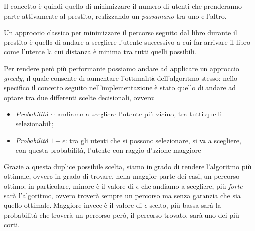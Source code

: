 Il concetto è quindi quello di minimizzare il numero di utenti che prenderanno parte attivamente al prestito, realizzando un \textit{passamano} tra uno e l'altro.

Un approccio classico per minimizzare il percorso seguito dal libro durante il prestito è quello di andare a scegliere l'utente successivo a cui far arrivare il libro come l'utente la cui distanza è minima tra tutti quelli possibili.

Per rendere però più performante possiamo andare ad applicare un approccio \textit{greedy}, il quale consente di aumentare l'ottimalità dell'algoritmo stesso: nello specifico il concetto seguito nell'implementazione è stato quello di andare ad optare tra due differenti scelte decisionali, ovvero:
\begin{itemize}
	\item \textit{Probabilità $\epsilon$}: andiamo a scegliere l'utente più vicino, tra tutti quelli selezionabili;
	\item \textit{Probabilità $1 - \epsilon$}: tra gli utenti che si possono selezionare, si va a scegliere, con questa probabilità, l'utente con raggio d'azione maggiore
\end{itemize}

Grazie a questa duplice possibile scelta, siamo in grado di rendere l'algoritmo più ottimale, ovvero in grado di trovare, nella maggior parte dei casi, un percorso ottimo; in particolare, minore è il valore di $\epsilon$ che andiamo a scegliere, più \textit{forte} sarà l'algoritmo, ovvero troverà sempre un percorso ma senza garanzia che sia quello ottimale.
Maggiore invece è il valore di $\epsilon$ scelto, più bassa sarà la probabilità che troverà un percorso però, il percorso trovato, sarà uno dei più corti.